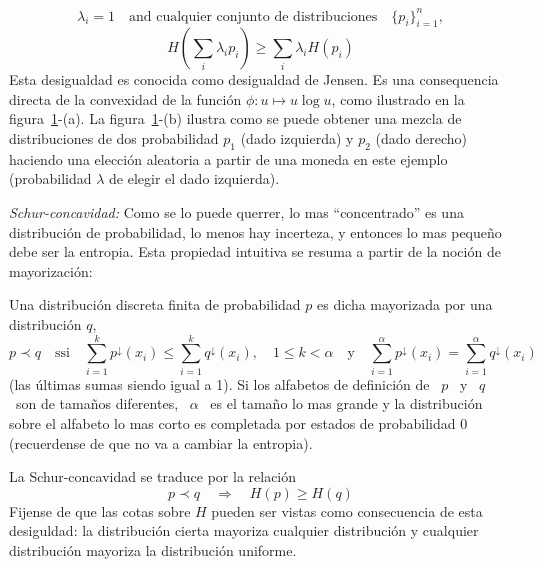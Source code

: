 \begin{propiedades}
\[  \lambda_i = 1  \quad \mbox{and cualquier conjunto de  distribuciones} \quad \{
  p_i \}_{i=1}^n,
  \]
  \[
  H\left(  \sum_i  \lambda_i p_i  \right)  \ge  \sum_i  \lambda_i H(p_i)
  \]
  Esta desigualdad es conocida como  desigualdad de Jensen.  Es una consequencia
  directa de  la convexidad  de la funci\'on  $\phi: u  \mapsto u \log  u$, como
  ilustrado       en       la      figura~\ref{fig:SZ:Concavidad}-(a).        La
  figura~\ref{fig:SZ:Concavidad}-(b) ilustra como se puede obtener una mezcla de
  distribuciones  de  dos probabilidad  $p_1$  (dado  izquierda)  y $p_2$  (dado
  derecho)  haciendo una elecci\'on  aleatoria a  partir de  una moneda  en este
  ejemplo (probabilidad $\lambda$ de elegir el dado izquierda).\newline
  \begin{figure}[h!]
  \begin{center}  \end{center}
  \label{fig:SZ:Concavidad}
  \end{figure}
%
\item\label{prop:SZ:Schurconcavidad}  {\it Schur-concavidad:}  Como se  lo puede
  querrer,  lo mas  ``concentrado'' es  una distribuci\'on  de  probabilidad, lo
  menos hay  incerteza, y entonces lo  mas peque\~no debe ser  la entropia. Esta
  propiedad intuitiva se resuma a partir de la noci\'on de mayorizaci\'on:
  \begin{definicion}[Mayorizaci\'on]\label{def:SZ:Mayorizacion}
    Una distribuci\'on  discreta finita de probabilidad $p$  es dicha mayorizada
    por una distribuci\'on $q$,
    \[
    p  \prec  q  \quad   \mbox{ssi}  \quad  \sum_{i=1}^k  p^\downarrow(x_i)  \le
    \sum_{i=1}^k q^\downarrow(x_i), \quad 1 \le  k < \alpha \quad \mbox{y} \quad
    \sum_{i=1}^\alpha p^\downarrow(x_i)  = \sum_{i=1}^\alpha q^\downarrow(x_i)
    \]
    (las \'ultimas sumas siendo igual a 1).  Si los alfabetos de definici\'on de
    \ $p$ \ y  \ $q$ \ son de tama\~nos diferentes, \  $\alpha$ \ es el tama\~no
    lo  mas  grande y  la  distribuci\'on  sobre el  alfabeto  lo  mas corto  es
    completada por estados de probabilidad 0 (recuerdense de que no va a cambiar
    la entropia).
  \end{definicion}
  La  Schur-concavidad  se  traduce  por  la  relaci\'on
  \[
  p \prec  q \quad \Rightarrow  \quad H(p) \ge  H(q)
  \]
  Fijense de que las cotas sobre $H$ pueden ser vistas como consecuencia de esta
  desiguldad:  la  distribuci\'on  cierta  mayoriza cualquier  distribuci\'on  y
  cualquier distribuci\'on mayoriza la distribuci\'on uniforme.
\end{propiedades}

